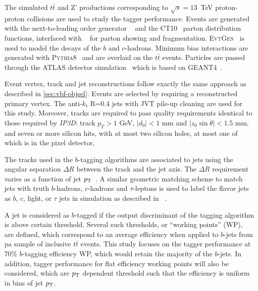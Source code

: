 The simulated $t\bar{t}$ and Z' productions corresponding to $\sqrt{s}=$13~TeV proton-proton
collisions are used to study the tagger performance. Events are generated with the
next-to-leading order generator \powheg{}~\cite{bib:powheg} and the \textsc{CT10}~\cite{Lai:2010vv}
parton distribution functions, interfaced with \pythia{}~\cite{pythia2} for parton showing and
fragmentation. \textsc{EvtGen}~\cite{Lange:2001uf} is used to model the decays of
the $b$ and $c$-hadrons. Minimum bias interactions are generated with \textsc{Pythia8}~\cite{Pythia8}
and are overlaid on the $t\bar{t}$ events. Particles are passed through the ATLAS detector
simulation~\cite{atlas_simulation} which is based on \textsc{GEANT4}~\cite{Agostinelli:2002hh}.

Event vertex, track and jet reconstructions follow exactly the same approach as described in \ref{sec:vbf-objsel}. Events are selected by requiring a reconstructed primary vertex. The anti-$k_t$ R=0.4 jets with JVT pile-up cleaning are used for this study. Moreover, tracks are required to pass quality requirements identical to those required by \textit{IP3D}: track $p_{T} > 1$ GeV, $| d_0 | <1$ mm and $| z_0 \sin \theta | <1.5$ mm, and seven or more silicon hits, with at most two silicon holes, at most one of which is in the pixel detector,

The tracks used in the $b$-tagging algorithms are associated to jets
using the angular separation $\Delta R$ between the track and the jet axis.
The $\Delta R$ requirement varies as a function of jet $p_{{\rm T}}$~\cite{ref:btagPaper}.
A similar geometric matching scheme to match jets with truth $b$-hadrons, $c$-hadrons and $\tau$-leptons
is used to label the flavor jets as $b$, $c$, light, or $\tau$ jets in simulation as described in ~\cite{ATL-PHYS-PUB-2015-022}.

A jet is considered as $b$-tagged if the output
discriminant of the tagging algorithm
is above certain threshold. Several such thresholds,
or ``working points'' (WP), are defined, which correspond to
an average efficiency when applied to $b$-jets from pa sample of
inclusive $t\bar{t}$ events. This study focuses on the tagger performance at
70\% $b$-tagging efficiency WP, which would retain the majority of the $b$-jets.
In addition, tagger performance for flat efficiency working points will also be considered,
which are $p_{{\rm T}}$ dependent threshold such that the \btagging efficiency
is uniform in bins of jet $p_{{\rm T}}$.
